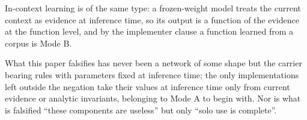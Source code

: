 In-context learning is of the same type: a frozen-weight model treats the current context as evidence at inference time, so its output is a function of the evidence at the function level, and by the implementer clause a function learned from a corpus is Mode B.

What this paper falsifies has never been a network of some shape but the carrier bearing rules with parameters fixed at inference time; the only implementations left outside the negation take their values at inference time only from current evidence or analytic invariants, belonging to Mode A to begin with. Nor is what is falsified ``these components are useless'' but only ``solo use is complete''.
